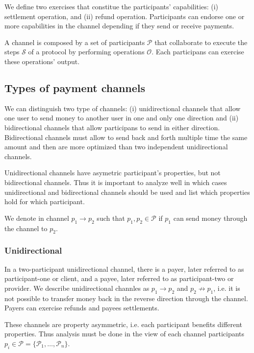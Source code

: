 \documentclass{llncs}
\begin{document}
We define two exercises that constitue the participants' capabilities: (i) settlement operation, and (ii) refund operation. Participants can endorse one or more capabilities in the channel depending if they send or receive payments.

\begin{definition}[Channel] A channel is composed by a set of participants $\mathcal{P}$ that collaborate to execute the steps $\mathcal{S}$ of a protocol by performing operations $\mathcal{O}$. Each participans can exercise these operations' output.
\end{definition}

\subsection{Types of payment channels}
We can distinguish two type of channels: (i) unidirectional channels that allow one user to send money to another user in one and only one direction and (ii) bidirectional channels that allow participans to send in either direction. Bidirectional channels must allow to send back and forth multiple time the same amount and then are more optimized than two independent unidirectional channels.

Unidirectional channels have asymetric participant's properties, but not bidirectional channels. Thus it is important to analyze well in which cases unidirectional and bidirectional channels should be used and list which properties hold for which participant.

We denote in channel $p_1 \rightarrow p_2$ such that $p_1, p_2 \in \mathcal{P}$ if $p_1$ can send money through the channel to $p_2$.

\subsubsection{Unidirectional}
In a two-participant unidirectional channel, there is a payer, later referred to as participant-one or client, and a payee, later referred to as participant-two or provider. We describe unidirectional channles as $p_1 \rightarrow p_2$ and  $p_2 \not\rightarrow p_1$, i.e. it is not possible to transfer money back in the reverse direction through the channel. Payers can exercise refunds and payees settlements.

These channels are property asymmetric, i.e. each participant benefits different properties. Thus analysis must be done in the view of each channel participants $p_i \in \mathcal{P} = \{\mathcal{P}_1, \dots, \mathcal{P}_n\}$.
\end{document}
